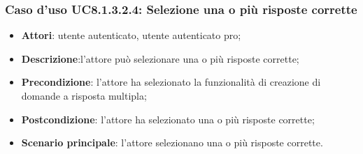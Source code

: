 \subsubsection{Caso d'uso UC8.1.3.2.4: Selezione una o più risposte corrette}
	\begin{itemize}
		\item
			\textbf{Attori}: utente autenticato, utente autenticato pro;
		\item		
			\textbf{Descrizione}:l'attore può selezionare una o più risposte corrette;
		\item
			\textbf{Precondizione}: l'attore ha selezionato la funzionalità di creazione di domande a risposta multipla; 
		\item
			\textbf{Postcondizione}: l'attore ha selezionato una o più risposte corrette;
		\item
			\textbf{Scenario principale}: l'attore selezionano una o più risposte corrette. 			
	\end{itemize}

	
	
	
	
	
	
	